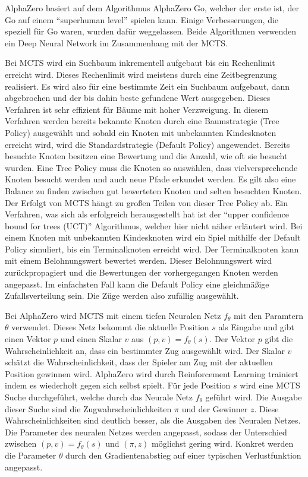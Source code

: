AlphaZero basiert auf dem Algorithmus AlphaZero Go, welcher der erste ist, der Go auf einem \enquote{superhuman level}\cite{silver_mastering_2017-1} spielen kann. Einige Verbesserungen, die speziell für Go waren, wurden dafür weggelassen.\cite{silver_mastering_2017} Beide Algorithmen verwenden ein Deep Neural Network im Zusammenhang mit der \ac{MCTS}.

Bei \ac{MCTS} wird ein Suchbaum inkrementell aufgebaut bis ein Rechenlimit erreicht wird. Dieses Rechenlimit wird meistens durch eine Zeitbegrenzung realisiert. Es wird also für eine bestimmte Zeit ein Suchbaum aufgebaut, dann abgebrochen und der bis dahin beste gefundene Wert ausgegeben. Dieses Verfahren ist sehr effizient für Bäume mit hoher Verzweigung. In diesem Verfahren werden bereits bekannte Knoten durch eine Baumstrategie (Tree Policy) ausgewählt und sobald ein Knoten mit unbekannten Kindesknoten erreicht wird, wird die Standardstrategie (Default Policy) angewendet. Bereits besuchte Knoten besitzen eine Bewertung und die Anzahl, wie oft sie besucht wurden. Eine Tree Policy muss die Knoten so auswählen, dass vielversprechende Knoten besucht werden und auch neue Pfade erkundet werden. Es gilt also eine Balance zu finden zwischen gut bewerteten Knoten und selten besuchten Knoten. Der Erfolgt von \ac{MCTS} hängt zu großen Teilen von dieser Tree Policy ab. Ein Verfahren, was sich als erfolgreich herausgestellt hat ist der \enquote{upper confidence bound for trees (UCT)} Algorithmus, welcher hier nicht näher erläutert wird. Bei einem Knoten mit unbekannten Kindesknoten wird ein Spiel mithilfe der Default Policy simuliert, bis ein Terminalknoten erreicht wird. Der Terminalknoten kann mit einem Belohnungswert bewertet werden. Dieser Belohnungswert wird zurückpropagiert und die Bewertungen der vorhergegangen Knoten werden angepasst. Im einfachsten Fall kann die Default Policy eine gleichmäßige Zufallsverteilung sein. Die Züge werden also zufällig ausgewählt.
\cite{browne_survey_2012}

Bei AlphaZero wird \ac{MCTS} mit einem tiefen Neuralen Netz $f_\theta$ mit den Paramtern $\theta$ verwendet. Dieses Netz bekommt die aktuelle Position $s$ als Eingabe und gibt einen Vektor $p$ und einen Skalar $v$ aus $(p, v) = f_\theta(s)$. Der Vektor $p$ gibt die Wahrscheinlichkeit an, dass ein bestimmter Zug ausgewählt wird. Der Skalar $v$ schätzt die Wahrscheinlichkeit, dass der Spieler am Zug mit der aktuellen Position gewinnen wird. AlphaZero wird durch Reinforcement Learning trainiert indem es wiederholt gegen sich selbst spielt. Für jede Position $s$ wird eine \ac{MCTS} Suche durchgeführt, welche durch das Neurale Netz $f_\theta$ geführt wird. Die Ausgabe dieser Suche sind die Zugwahrscheinlichkeiten $\pi$ und der Gewinner $z$. Diese Wahrscheinlichkeiten sind deutlich besser, als die Ausgaben des Neuralen Netzes. Die Parameter des neuralen Netzes werden angepasst, sodass der Unterschied zwischen $(p, v) = f_\theta(s)$ und $(\pi, z)$ möglichst gering wird. Konkret werden die Parameter $\theta$ durch den Gradientenabstieg auf einer typischen Verlustfunktion angepasst.
\cite{silver_mastering_2017-1}\cite{silver_mastering_2017}

